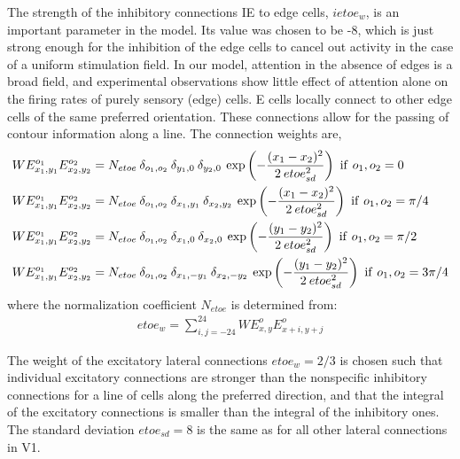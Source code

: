The strength of the inhibitory connections IE to edge cells,
$ietoe_w$, is an important parameter in the model. Its value was
chosen to be -8, which is just strong enough for the inhibition of the
edge cells to cancel out activity in the case of a uniform stimulation
field. In our model, attention in the absence of edges is a broad
field, and experimental observations show little effect of attention
alone on the firing rates of purely sensory (edge) cells.
E cells locally connect to other edge cells of the same preferred
orientation. These connections allow for the passing of contour
information along a line. The connection weights are,
\begin{align}
	WE^{o_1}_{x_1,y_1}E^{o_2}_{x_2,y_2}&=N_{etoe}\: \delta_{o_1,o_2}\: \delta_{y_1,0}\: \delta_{y_2,0}\:
	\exp\left(-\frac{(x_1-x_2)^2}{2\: etoe_{sd} ^2}\right)\ {\rm
          if}\ o_1,o_2 = 0 \nonumber\\
	WE^{o_1}_{x_1,y_1}E^{o_2}_{x_2,y_2}&=N_{etoe}\: \delta_{o_1,o_2}\: \delta_{x_1,y_1}\: \delta_{x_2,y_2}\: 
	\exp\left(-\frac{(x_1-x_2)^2}{2\: etoe_{sd} ^2}\right)\  {\rm
          if}\ o_1,o_2 = \pi/4 \nonumber\\
	WE^{o_1}_{x_1,y_1}E^{o_2}_{x_2,y_2}&=N_{etoe}\: \delta_{o_1,o_2}\: \delta_{x_1,0}\: \delta_{x_2,0}\:
	\exp\left(-\frac{(y_1-y_2)^2}{2\: etoe_{sd} ^2}\right)\  {\rm
          if}\ o_1,o_2 = \pi/2 \nonumber\\
	WE^{o_1}_{x_1,y_1}E^{o_2}_{x_2,y_2}&=N_{etoe}\: \delta_{o_1,o_2}\: \delta_{x_1,-y_1}\: \delta_{x_2,-y_2}\: 
	\exp\left(-\frac{(y_1-y_2)^2}{2\: etoe_{sd} ^2}\right)\  {\rm
          if}\ o_1,o_2 = 3\pi/4 \nonumber\\
\end{align}
where the normalization coefficient $N_{etoe}$ is determined from:
\begin{align}
	etoe_w = \sum^{24}_{i,j=-24} WE^{o}_{x,y}E^{o}_{x+i,y+j}
\end{align}

The weight of the excitatory lateral connections $etoe_w=2/3$ is
chosen such that individual excitatory connections are stronger than
the nonspecific inhibitory connections for a line of cells along the
preferred direction, 
and that the integral of the excitatory connections is smaller than
the integral of the inhibitory ones. The standard deviation
$etoe_{sd}=8$ is the same as for all other lateral connections in V1.  

